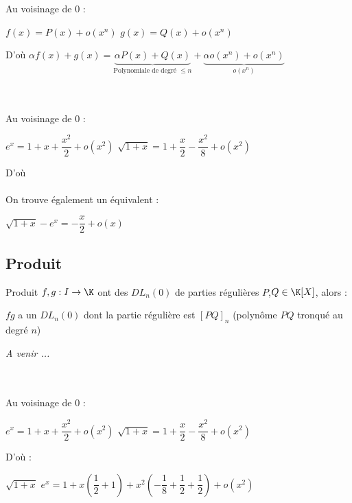 \documentclass[12pt,a4paper]{report}
\begin{document}
\begin{demo}
Au voisinage de 0 :
\begin{center}
    $f(x) = P(x) + o(x^n)$
    $g(x) = Q(x) + o(x^n)$
\end{center}
D'où $\alpha f(x) +g(x)= \underbrace{\alpha P(x) + Q(x)}_{\text{Polynomiale de degré } \leq n} + \underbrace{\alpha o(x^n) + o(x^n)}_{o(x^n)}$
\end{demo}

\begin{exemple}
\\
\\
Au voisinage de 0 : 
\begin{center}
    $e^x = 1 +x+ \dfrac{x^2}{2} + o(x^2)$ \: \: \: \: \: $\sqrt{1+x} = 1 + \dfrac{x}{2} - \dfrac{x^2}{8} + o(x^2)$
\end{center}
D'où \\
\\
On trouve également un équivalent : 
\begin{center}
    $\sqrt{1+x} - e^x = - \dfrac{x}{2} +o(x)$\\
\end{center}
\end{exemple}

\pagebreak

\subsection{Produit}
\begin{proposition}{Produit}{}
$f,g : I \to \K$ ont des $DL_n (0)$ de parties régulières $P$,$Q \in \K[X]$, alors :
\begin{center}
    $fg$ a un $DL_n(0)$ dont la partie régulière est $[PQ]_n$ (polynôme $PQ$ tronqué au degré $n$)
\end{center}
\end{proposition}

\begin{demo}
\textit{A venir ...}
\end{demo}

\begin{exemple}
\\
\\
Au voisinage de 0 : 
\begin{center}
    $e^x = 1 +x+ \dfrac{x^2}{2} + o(x^2)$ \: \: \: \: \: $\sqrt{1+x} = 1 + \dfrac{x}{2} - \dfrac{x^2}{8} + o(x^2)$\\
\end{center}
D'où : 
\begin{center}
    $\sqrt{1+x}$ $e^x = 1 + x(\dfrac{1}{2} + 1) + x^2 (- \dfrac{1}{8}+ \dfrac{1}{2} + \dfrac{1}{2}) + o(x^2)$\\
\end{center}
\end{exemple}
\end{document}
